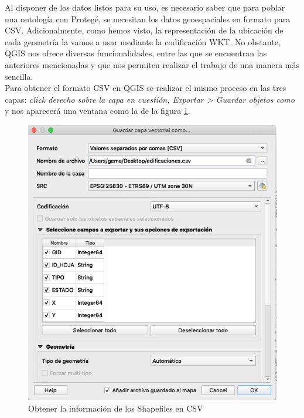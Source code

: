 Al disponer de los datos listos para su uso, es necesario saber que para poblar una ontología con Protegé, se necesitan los datos geoespaciales en formato para CSV. Adicionalmente, como hemos visto, la representación de la ubicación de cada geometría la vamos a usar mediante la codificación WKT. No obstante, QGIS nos ofrece diversas funcionalidades, entre las que se encuentran las anteriores mencionadas y que nos permiten realizar el trabajo de una manera más sencilla.\\ 





Para obtener el formato CSV en QGIS se realizar el mismo proceso en las tres capas: \textit{click derecho sobre la capa en cuestión, Exportar > Guardar objetos como} y nos aparecerá una ventana como la de la figura \ref{fig:csv}.

\begin{figure}[H]
	\centering
	\includegraphics[width=0.6\linewidth]{imagenes/capitulo5/csv}
	\caption{Obtener la información de los Shapefiles en CSV}
	\label{fig:csv}
\end{figure}

